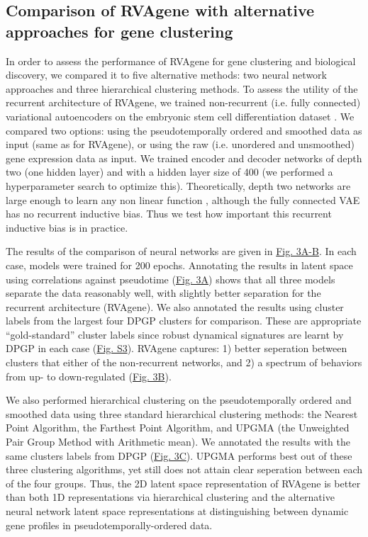 \subsection{Comparison of RVAgene with alternative approaches for gene clustering}

In order to assess the performance of RVAgene for gene clustering and biological discovery, we compared it to five alternative methods: two neural network approaches and three hierarchical clustering methods. To assess the utility of the recurrent architecture of RVAgene, we trained non-recurrent (i.e. fully connected) variational autoencoders on the embryonic stem cell differentiation dataset \citep{Klein2015}. We compared two options: using the pseudotemporally ordered and smoothed data as input (same as for RVAgene), or using the raw (i.e. unordered and unsmoothed) gene expression data as input. We trained encoder and decoder networks of depth two (one hidden layer) and with a hidden layer size of 400 (we performed a hyperparameter search to optimize this). Theoretically, depth two networks are large enough to learn any non linear function \citep{cybenko1989approximation, hornik1989multilayer, funahashi1989approximate, barron1994approximation}, although the fully connected VAE has no recurrent inductive bias. Thus we test how important this recurrent inductive bias is in practice. 
\par 
The results of the comparison of neural networks are given in \hyperref[fig:fig4]{Fig. 3A-B}. In each case, models were trained for 200 epochs. Annotating the results in latent space using correlations against pseudotime (\hyperref[fig:fig4]{Fig. 3A}) shows that all three models separate the data reasonably well, with slightly better separation for the recurrent architecture (RVAgene). We also annotated the results using cluster labels from the largest four DPGP clusters for comparison. These are appropriate ``gold-standard'' cluster labels since robust dynamical signatures are learnt by DPGP in each case (\hyperref[supp]{Fig. S3}). RVAgene captures: 1) better seperation between clusters that either of the non-recurrent networks, and 2) a spectrum of behaviors from up- to down-regulated (\hyperref[fig:fig4]{Fig. 3B}).
\par 
We also performed hierarchical clustering on the pseudotemporally ordered and smoothed data using three standard hierarchical clustering methods: the Nearest Point Algorithm, the Farthest Point Algorithm, and UPGMA (the Unweighted Pair Group Method with Arithmetic mean). We annotated the results with the same clusters labels from DPGP (\hyperref[fig:fig4]{Fig. 3C}). UPGMA performs best out of these three clustering algorithms, yet still does not attain clear seperation between each of the four groups. Thus, the 2D latent space representation of RVAgene is better than both 1D representations via hierarchical clustering and the alternative neural network latent space representations at distinguishing between dynamic gene profiles in pseudotemporally-ordered data.



